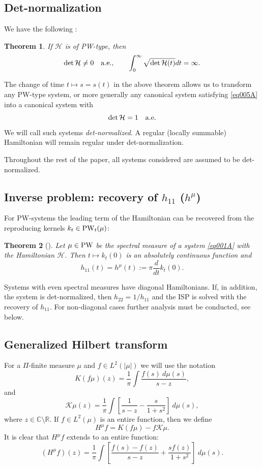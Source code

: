 \documentclass[11pt,twoside,reqno]{amsart}
\def\PW{\text{\rm PW}}
\def\ms{\bigskip}
\def\ms{\medskip}
\def\R{{\mathbb R}}
\def\C{{\mathbb{C}}}
\def\HH{{\mathcal H}}
\def\KK{{\mathcal K}}
\theoremstyle{plain}
\newtheorem{theorem}{Theorem}
\numberwithin{equation}{section}
\begin{document}
\ms\subsection{ Det-normalization} We have the following \cite{etudes}:

\begin{theorem}\label{t0001} If $\HH$ is of PW-type, then
	\begin{equation}
		\det \HH\ne 0\quad{\rm a.e.},\qquad \int_0^\infty\sqrt{\det\HH(t)}dt=\infty. \label{eq005A}
	\end{equation}
\end{theorem}

	The change of time $t\mapsto s=s(t)$ in the above theorem allows us to transform any PW-type system, or more generally any canonical system satisfying 
\eqref{eq005A}
	 into a canonical system with $$\det \HH=1\quad{\rm a.e.}$$
	We will call such systems {\it det-normalized}. A regular (locally summable) Hamiltonian will remain regular under det-normalization.
	
	Throughout the rest of the paper, all systems considered are assumed to be det-normalized.
	
	
	\ms\subsection{Inverse problem: recovery of $h_{11}$ ($h^\mu$)}
	For PW-systems the leading term of the Hamiltonian can be recovered from the reproducing kernels $k_t\in {\rm PW}_t(\mu)$:
	
	
	\begin{theorem}[\cite{etudes}]\label{t3} Let $\mu\in\PW$ be the spectral measure of a system \eqref{eq001A} with the Hamiltonian $\HH$. Then $t\mapsto k_t(0)$ is an absolutely continuous
		function and 
		\begin{equation}h_{11}(t)=h^\mu(t):=\pi\frac d{dt} k_t(0).\label{eq003A}\end{equation}
	\end{theorem}
	
	Systems with even spectral measures have diagonal Hamiltonians. If, in addition, the system is det-normalized, then 
	$h_{22}=1/h_{11}$ and the ISP is solved with the recovery of $h_{11}$. For non-diagonal cases further analysis must be conducted, see below.
	



\ms\subsection{Generalized Hilbert transform}\label{secHT} For a $\Pi$-finite measure $\mu$ and $f\in L^2(|\mu|)$ we will use the notation
$$ K(f\mu)(z)=\frac1{\pi }\int\frac{f(s)~d\mu(s)}{s-z},$$
and
$$\KK\mu(z)=\frac1{\pi }\int\left[\frac1{s-z}-\frac s{1+s^2}\right]~d\mu(s),$$
where $z\in\C\setminus\R$. If $f\in L^2(\mu)$ is an entire function, then we define
$$H^\mu f=K(f\mu)-f\KK\mu.$$
It is clear that $H^\mu f$ extends to an entire function:
$$
(H^\mu f)(z)=\frac1\pi\int\left[\frac{f(s)-f(z)}{s-z}+\frac{s f(z)}{1+s^2}\right]~d\mu(s).$$
\end{document}
